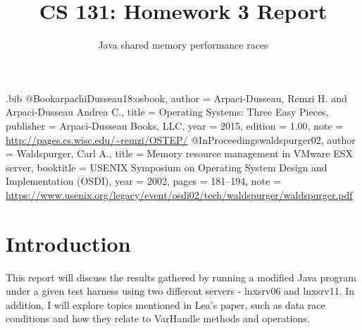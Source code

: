 \usepackage{filecontents}

\usepackage{graphicx}
\graphicspath{{\downloads }}

\begin{filecontents}{\jobname.bib}
@Book{arpachiDusseau18:osbook,
  author =       {Arpaci-Dusseau, Remzi H. and Arpaci-Dusseau Andrea C.},
  title =        {Operating Systems: Three Easy Pieces},
  publisher =    {Arpaci-Dusseau Books, LLC},
  year =         2015,
  edition =      {1.00},
  note =         {\url{http://pages.cs.wisc.edu/~remzi/OSTEP/}}
}
@InProceedings{waldspurger02,
  author =       {Waldspurger, Carl A.},
  title =        {Memory resource management in {VMware ESX} server},
  booktitle =    {USENIX Symposium on Operating System Design and
                  Implementation (OSDI)},
  year =         2002,
  pages =        {181--194},
  note =         {\url{https://www.usenix.org/legacy/event/osdi02/tech/waldspurger/waldspurger.pdf}}}
\end{filecontents}


\title{\Large \bf CS 131: Homework 3 Report}
\author{Java shared memory performance races}
\maketitle

\section{Introduction}

This report will discuss the results gathered by running a modified Java program under a given test harness using two different servers - lnxsrv06 and lnxsrv11. In addition, I will explore topics mentioned in Lea's paper, such as data race conditions and how they relate to VarHandle methods and operations. 



